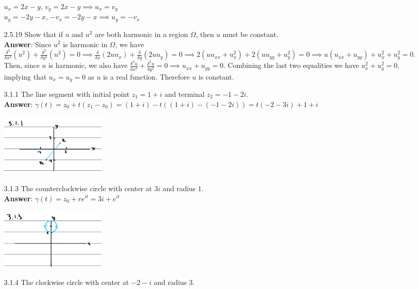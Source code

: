 \documentclass{article}
\begin{document}
\begin{itemize}
            $u_x=2x-y$, $v_y=2x-y\implies u_x=v_y$\\
            $u_y=-2y-x$, $-v_x=-2y-x\implies u_y=-v_x$
      \item [2.5.19] Show that if $u$ and $u^2$ are both harmonic in a region $\Omega$, then $u$ must be constant.\\
            \textbf{Answer}: Since $u^2$ is harmonic in $\Omega$, we have $\frac{\delta^2}{\delta x^2}(u^2)+\frac{\delta^2}{\delta y^2}(u^2)=0\implies\frac{\delta}{\delta x}(2uu_{x})+\frac{\delta}{\delta y}(2uu_{y})=0\implies 2(uu_{xx}+u_x^2)+2(uu_{yy}+u_y^2)=0\implies u(u_{xx}+u_{yy})+u_x^2+u_y^2=0$. Then, since $u$ is harmonic, we also have $\frac{\delta^2 u}{\delta x^2}+\frac{\delta^2 u}{\delta y^2}=0\implies u_{xx}+u_{yy}=0$. Combining the last two equalities we have $u_x^2+u_y^2=0$, implying that $u_x=u_y=0$ as $u$ is a real function. Therefore $u$ is constant.
      \item [3.1.1] The line segment with initial point $z_1=1+i$ and terminal $z_2=-1-2i$.\\
            \textbf{Answer}: $\gamma(t)=z_0+t(z_1-z_0)=(1+i)-t((1+i)-(-1-2i))=t(-2-3i)+1+i$
            \begin{center}
                  \includegraphics[width=2in]{3-1-1.png}
            \end{center}
      \item [3.1.3] The counterclockwise circle with center at $3i$ and radius $1$.\\
            \textbf{Answer}: $\gamma(t)=z_0+re^{it}=3i+e^{it}$
            \begin{center}
                  \includegraphics[width=2in]{3-1-3.png}
            \end{center}
      \item [3.1.4] The clockwise circle with center at $-2-i$ and radius $3$.\\

\end{itemize}
\end{document}
